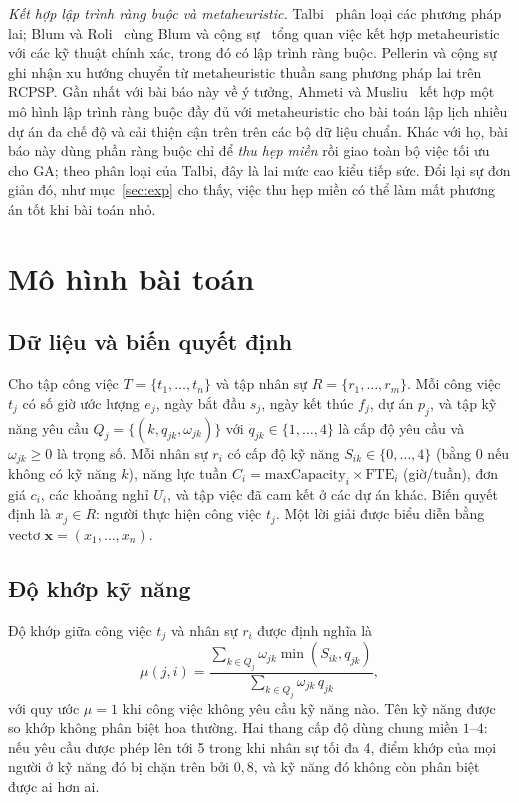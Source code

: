 \documentclass{IEEEtran}
\begin{document}
\textit{Kết hợp lập trình ràng buộc và metaheuristic.} Talbi~\cite{talbi2002} phân loại các phương pháp lai; Blum và Roli~\cite{blum2003} cùng Blum và cộng sự~\cite{blum2011} tổng quan việc kết hợp metaheuristic với các kỹ thuật chính xác, trong đó có lập trình ràng buộc. Pellerin và cộng sự~\cite{pellerin2020} ghi nhận xu hướng chuyển từ metaheuristic thuần sang phương pháp lai trên RCPSP. Gần nhất với bài báo này về ý tưởng, Ahmeti và Musliu~\cite{ahmeti2025} kết hợp một mô hình lập trình ràng buộc đầy đủ với metaheuristic cho bài toán lập lịch nhiều dự án đa chế độ và cải thiện cận trên trên các bộ dữ liệu chuẩn. Khác với họ, bài báo này dùng phần ràng buộc chỉ để \emph{thu hẹp miền} rồi giao toàn bộ việc tối ưu cho GA; theo phân loại của Talbi, đây là lai mức cao kiểu tiếp sức. Đổi lại sự đơn giản đó, như mục~\ref{sec:exp} cho thấy, việc thu hẹp miền có thể làm mất phương án tốt khi bài toán nhỏ.

\section{Mô hình bài toán}
\label{sec:model}

\subsection{Dữ liệu và biến quyết định}

Cho tập công việc $T=\{t_1,\dots,t_n\}$ và tập nhân sự $R=\{r_1,\dots,r_m\}$. Mỗi công việc $t_j$ có số giờ ước lượng $e_j$, ngày bắt đầu $s_j$, ngày kết thúc $f_j$, dự án $p_j$, và tập kỹ năng yêu cầu $Q_j=\{(k, q_{jk}, \omega_{jk})\}$ với $q_{jk}\in\{1,\dots,4\}$ là cấp độ yêu cầu và $\omega_{jk}\ge 0$ là trọng số. Mỗi nhân sự $r_i$ có cấp độ kỹ năng $S_{ik}\in\{0,\dots,4\}$ (bằng 0 nếu không có kỹ năng $k$), năng lực tuần $C_i=\text{maxCapacity}_i\times\text{FTE}_i$ (giờ/tuần), đơn giá $c_i$, các khoảng nghỉ $U_i$, và tập việc đã cam kết ở các dự án khác. Biến quyết định là $x_j\in R$: người thực hiện công việc $t_j$. Một lời giải được biểu diễn bằng vectơ $\mathbf{x}=(x_1,\dots,x_n)$.

\subsection{Độ khớp kỹ năng}

Độ khớp giữa công việc $t_j$ và nhân sự $r_i$ được định nghĩa là
\begin{equation}
\mu(j,i)=\frac{\sum_{k\in Q_j}\omega_{jk}\min(S_{ik},q_{jk})}{\sum_{k\in Q_j}\omega_{jk}\,q_{jk}},
\label{eq:skill}
\end{equation}
với quy ước $\mu=1$ khi công việc không yêu cầu kỹ năng nào. Tên kỹ năng được so khớp không phân biệt hoa thường. Hai thang cấp độ dùng chung miền $1$--$4$: nếu yêu cầu được phép lên tới 5 trong khi nhân sự tối đa 4, điểm khớp của mọi người ở kỹ năng đó bị chặn trên bởi $0{,}8$, và kỹ năng đó không còn phân biệt được ai hơn ai.
\end{document}
